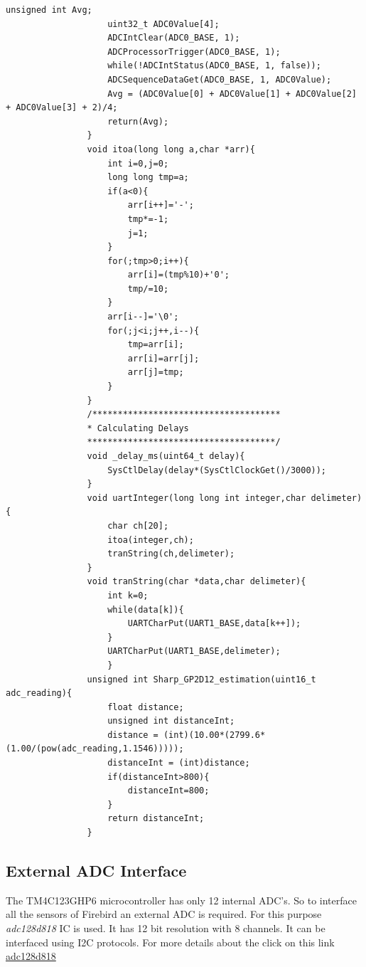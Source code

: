 \documentclass[a4paper,10pt,oneside]{article}
\begin{document}
\begin{lstlisting}[style=CStyle]
					unsigned int Avg;
					uint32_t ADC0Value[4];
					ADCIntClear(ADC0_BASE, 1);
					ADCProcessorTrigger(ADC0_BASE, 1);
					while(!ADCIntStatus(ADC0_BASE, 1, false));
					ADCSequenceDataGet(ADC0_BASE, 1, ADC0Value);
					Avg = (ADC0Value[0] + ADC0Value[1] + ADC0Value[2] + ADC0Value[3] + 2)/4;
					return(Avg);
				}
				void itoa(long long a,char *arr){
					int i=0,j=0;
					long long tmp=a;
					if(a<0){
						arr[i++]='-';
						tmp*=-1;
						j=1;
					}
					for(;tmp>0;i++){
						arr[i]=(tmp%10)+'0';
						tmp/=10;
					}
					arr[i--]='\0';
					for(;j<i;j++,i--){
						tmp=arr[i];
						arr[i]=arr[j];
						arr[j]=tmp;
					}
				}
				/*************************************
				* Calculating Delays
				*************************************/
				void _delay_ms(uint64_t delay){
					SysCtlDelay(delay*(SysCtlClockGet()/3000));
				}
				void uartInteger(long long int integer,char delimeter){
					char ch[20];
					itoa(integer,ch);
					tranString(ch,delimeter);
				}
				void tranString(char *data,char delimeter){
					int k=0;
					while(data[k]){
						UARTCharPut(UART1_BASE,data[k++]);
					}
					UARTCharPut(UART1_BASE,delimeter);
					}
				unsigned int Sharp_GP2D12_estimation(uint16_t adc_reading){
					float distance;
					unsigned int distanceInt;
					distance = (int)(10.00*(2799.6*(1.00/(pow(adc_reading,1.1546)))));
					distanceInt = (int)distance;
					if(distanceInt>800){
						distanceInt=800;
					}
					return distanceInt;
				}
			\end{lstlisting}
			
		\subsection{\huge\textbf{External ADC Interface}}
			{The TM4C123GHP6 microcontroller has only 12 internal ADC's. So to interface all the sensors of Firebird an external ADC is required. For this purpose \textit{adc128d818} IC is used. It has 12 bit resolution with 8 channels. It can be interfaced using I2C protocols. For more details about the click on this link  
			\href{www.ti.com/general/docs/lit/getliterature.tsp?baseLiteratureNumber=snas483&fileType=pdf}{adc128d818}}
			
\end{document}
